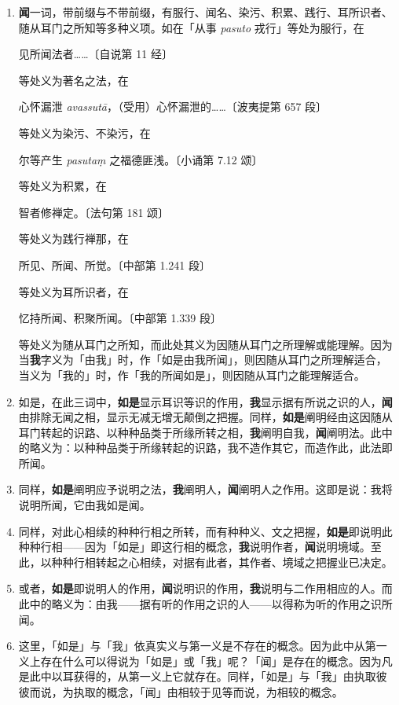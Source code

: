 \begin{enumerate}
\item \textbf{闻}一词，带前缀与不带前缀，有服行、闻名、染污、积累、践行、耳所识者、随从耳门之所知等多种义项。如在「从事 \textit{pasuto} 戎行」等处为服行，在\begin{quoting}见所闻法者……{\bluefootnotesize 〔自说第 11 经〕}\end{quoting}等处义为著名之法，在\begin{quoting}心怀漏泄 \textit{avassutā}，（受用）心怀漏泄的……{\bluefootnotesize 〔波夷提第 657 段〕}\end{quoting}等处义为染污、不染污，在\begin{quoting}尔等产生 \textit{pasutaṃ} 之福德匪浅。{\bluefootnotesize 〔小诵第 7.12 颂〕}\end{quoting}等处义为积累，在\begin{quoting}智者修禅定。{\bluefootnotesize 〔法句第 181 颂〕}\end{quoting}等处义为践行禅那，在\begin{quoting}所见、所闻、所觉。{\bluefootnotesize 〔中部第 1.241 段〕}\end{quoting}等处义为耳所识者，在\begin{quoting}忆持所闻、积聚所闻。{\bluefootnotesize 〔中部第 1.339 段〕}\end{quoting}等处义为随从耳门之所知，而此处其义为因随从耳门之所理解或能理解。因为当\textbf{我}字义为「由我」时，作「如是由我所闻」，则因随从耳门之所理解适合，当义为「我的」时，作「我的所闻如是」，则因随从耳门之能理解适合。
\item 如是，在此三词中，\textbf{如是}显示耳识等识的作用，\textbf{我}显示据有所说之识的人，\textbf{闻}由排除无闻之相，显示无减无增无颠倒之把握。同样，\textbf{如是}阐明经由这因随从耳门转起的识路、以种种品类于所缘所转之相，\textbf{我}阐明自我，\textbf{闻}阐明法。此中的略义为：以种种品类于所缘转起的识路，我不造作其它，而造作此，此法即所闻。
\item 同样，\textbf{如是}阐明应予说明之法，\textbf{我}阐明人，\textbf{闻}阐明人之作用。这即是说：我将说明所闻，它由我如是闻。
\item 同样，对此心相续的种种行相之所转，而有种种义、文之把握，\textbf{如是}即说明此种种行相——因为「如是」即这行相的概念，\textbf{我}说明作者，\textbf{闻}说明境域。至此，以种种行相转起之心相续，对据有此者，其作者、境域之把握业已决定。
\item 或者，\textbf{如是}即说明人的作用，\textbf{闻}说明识的作用，\textbf{我}说明与二作用相应的人。而此中的略义为：由我——据有听的作用之识的人——以得称为听的作用之识所闻。
\item 这里，「如是」与「我」依真实义与第一义是不存在的概念。因为此中从第一义上存在什么可以得说为「如是」或「我」呢？「闻」是存在的概念。因为凡是此中以耳获得的，从第一义上它就存在。同样，「如是」与「我」由执取彼彼而说，为执取的概念，「闻」由相较于见等而说，为相较的概念。

\end{enumerate}

